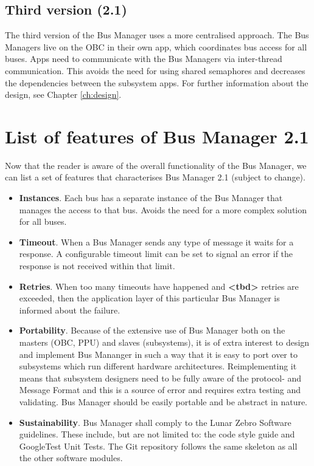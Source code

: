 \subsection{Third version (2.1)}
The third version of the Bus Manager uses a more centralised approach. The Bus Managers live on the OBC in their own app, which coordinates bus access for all buses. Apps need to communicate with the Bus Managers via inter-thread communication. This avoids the need for using shared semaphores and decreases the dependencies between the subsystem apps. For further information about the design, see Chapter \ref{ch:design}.


\section{List of features of Bus Manager 2.1}

Now that the reader is aware of the overall functionality of the Bus Manager, we can list a set of features that characterises Bus Manager 2.1 (subject to change).

\begin{itemize}

    \item{\textbf{Instances}. Each bus has a separate instance of the Bus Manager that manages the access to that bus. Avoids the need for a more complex solution for all buses.}

    \item{\textbf{Timeout}. When a Bus Manager sends any type of message it waits for a response. A configurable timeout limit can be set to signal an error if the response is not received within that limit. }

    \item{\textbf{Retries}. When too many timeouts have happened and \textbf{<tbd>} retries are exceeded, then the application layer of this particular Bus Manager is informed about the failure.}

    \item{\textbf{Portability}. Because of the extensive use of Bus Manager both on the masters (OBC, PPU) and slaves (subsystems), it is of extra interest to design and implement Bus Mananger in such a way that it is easy to port over to subsystems which run different hardware architectures. Reimplementing it means that subsystem designers need to be fully aware of the protocol- and Message Format and this is a source of error and requires extra testing and validating. Bus Manager should be easily portable and be abstract in nature.}

    \item{\textbf{Sustainability}. Bus Manager shall comply to the Lunar Zebro Software guidelines. These include, but are not limited to: the code style guide and GoogleTest Unit Tests. The Git repository follows the same skeleton as all the other software modules.}

\end{itemize}
